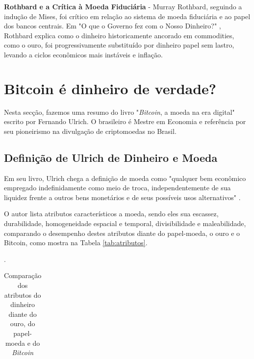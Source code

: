 \documentclass[article,12pt,oneside,a4paper,english,brazil]{unifil}
\begin{document}
\begin{Spacing}{1.5}
\textbf{Rothbard e a Crítica à Moeda Fiduciária} - Murray Rothbard, seguindo a indução de Mises, foi crítico em relação ao sistema de moeda fiduciária e ao papel dos bancos centrais. Em "O que o Governo fez com o Nosso Dinheiro?" \cite{rothbard2022governo}, Rothbard explica como o dinheiro historicamente ancorado em commodities, como o ouro, foi progressivamente substituído por dinheiro papel sem lastro, levando a ciclos econômicos mais instáveis e inflação.

\section*{Bitcoin é dinheiro de verdade?} \label{sec:dinheiro}
Nesta secção, fazemos uma resumo do livro "\textit{Bitcoin}, a moeda na era digital"\cite{Ulrich2014} escrito por Fernando Ulrich. O brasileiro é Mestre em Economia e referência por seu pioneirismo na divulgação de criptomoedas no Brasil.

\subsection*{Definição de Ulrich de Dinheiro e Moeda}

Em seu livro, Ulrich chega a definição de moeda como "qualquer bem econômico empregado indefinidamente como meio de troca, independentemente de sua liquidez frente a outros bens monetários e de seus possíveis usos alternativos" \cite[P.89]{Ulrich2014}.

O autor lista atributos característicos a moeda, sendo eles sua escassez,
durabilidade, homogeneidade espacial e temporal, divisibilidade e maleabilidade, comparando o desempenho destes atributos diante do papel-moeda, o ouro e o Bitcoin, como mostra na Tabela \ref*{tab:atributos}.

\FloatBarrier
\begin{table}[h]
    \centering
	\caption{Comparação dos atributos do dinheiro diante do ouro, do papel-moeda e do \textit{Bitcoin}}.
	\begin{tabular}{|c|c|c|c|}


\end{tabular}
\end{table}
\end{Spacing}
\end{document}

